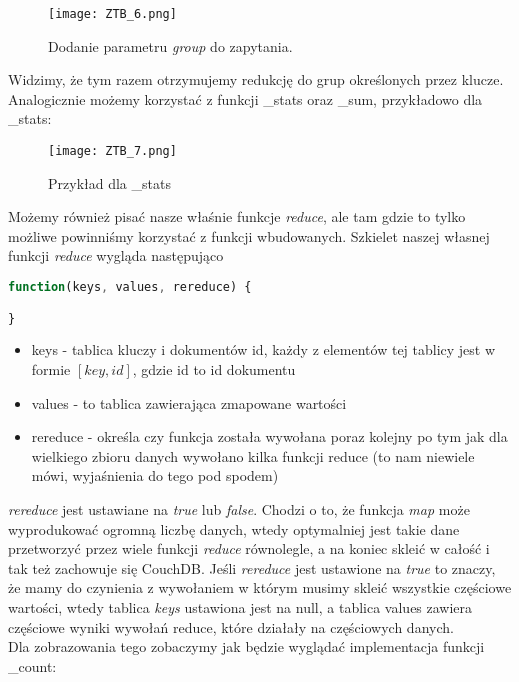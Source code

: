 \documentclass[a4paper,15pt]{article}
\begin{document}
\begin{figure}[H]
\centering
  \texttt{[image: ZTB\_6.png]}
  \caption{Dodanie parametru \textit{group} do zapytania.}
\end{figure}

Widzimy, że tym razem otrzymujemy redukcję do grup określonych przez klucze.  \\

Analogicznie możemy korzystać z funkcji \_stats oraz \_sum, przykładowo dla \_stats:

\begin{figure}[H]
\centering
  \texttt{[image: ZTB\_7.png]}
  \caption{Przykład dla \_stats}
\end{figure}


Możemy również pisać nasze właśnie funkcje \textit{reduce}, ale tam gdzie to tylko możliwe powinniśmy korzystać z funkcji wbudowanych. Szkielet naszej własnej funkcji \textit{reduce} wygląda następująco
\begin{lstlisting}[language=JavaScript]
function(keys, values, rereduce) {

}
\end{lstlisting}
\begin{itemize}
\item keys - tablica kluczy i dokumentów id, każdy z elementów tej tablicy jest w formie $[key,id]$, gdzie id to id dokumentu
\item values - to tablica zawierająca zmapowane wartości
\item rereduce - określa czy funkcja została wywołana poraz kolejny po tym jak dla wielkiego zbioru danych wywołano kilka funkcji reduce (to nam niewiele mówi, wyjaśnienia do tego pod spodem)
\end{itemize}
\textit{rereduce} jest ustawiane na \textit{true} lub \textit{false}. Chodzi o to, że funkcja \textit{map} może wyprodukować ogromną liczbę danych, wtedy optymalniej jest takie dane przetworzyć przez wiele funkcji \textit{reduce} równolegle, a na koniec skleić w całość i tak też zachowuje się CouchDB. Jeśli \textit{rereduce} jest ustawione na \textit{true} to znaczy, że mamy do czynienia z wywołaniem w którym musimy skleić wszystkie częściowe wartości, wtedy tablica \textit{keys} ustawiona jest na null, a tablica values zawiera częściowe wyniki wywołań reduce, które działały na częściowych danych. \\

Dla zobrazowania tego zobaczymy jak będzie wyglądać implementacja funkcji \_count:
\end{document}
